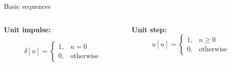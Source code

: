 \documentclass[10pt, aspectratio=169]{beamer}
\begin{document}
%
\begin{frame}{Basic sequences}
	\begin{columns}[t]
		\begin{column}{0.5\linewidth}
			\textbf{Unit impulse:} 
			
			\begin{equation*}
				\delta[n] = \begin{cases}
				1, & n = 0 \\
				0, & \text{otherwise}
				\end{cases}
			\end{equation*}
		\end{column}		
		
		\begin{column}{0.5\linewidth}
			\textbf{Unit step:} 
			\begin{equation*}
				u[n] = \begin{cases}
				1, & n \geq 0 \\
				0, & \text{otherwise}
				\end{cases}
			\end{equation*}
		\end{column}
	\end{columns}
	\vspace{0.5cm}
	\begin{columns}[t]
	\begin{column}{0.4\linewidth}		
		\centering
		\resizebox{\linewidth}{!}{}
	\end{column}		
	
	\begin{column}{0.4\linewidth}
		\centering
		\resizebox{\linewidth}{!}{}
	\end{column}
\end{columns}
\end{frame}
\end{document}
